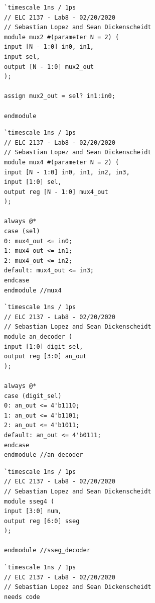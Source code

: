 \documentclass[11pt]{article}
\begin{document}
\begin{lstlisting}[style=Verilog,
caption=mux2 Code,
label=code:ex 
]
`timescale 1ns / 1ps
// ELC 2137 - Lab8 - 02/20/2020
// Sebastian Lopez and Sean Dickenscheidt
module mux2 #(parameter N = 2) (
input [N - 1:0] in0, in1,
input sel,
output [N - 1:0] mux2_out
); 

assign mux2_out = sel? in1:in0; 

endmodule  
\end{lstlisting}

\begin{lstlisting}[style=Verilog,
caption=mux4 Code,
label=code:ex 
]
`timescale 1ns / 1ps
// ELC 2137 - Lab8 - 02/20/2020
// Sebastian Lopez and Sean Dickenscheidt
module mux4 #(parameter N = 2) (
input [N - 1:0] in0, in1, in2, in3, 
input [1:0] sel, 
output reg [N - 1:0] mux4_out
);

always @*
case (sel) 
0: mux4_out <= in0; 
1: mux4_out <= in1; 
2: mux4_out <= in2; 
default: mux4_out <= in3;     
endcase 
endmodule //mux4 
\end{lstlisting}

\begin{lstlisting}[style=Verilog,
caption=an decoder Code,
label=code:ex 
]
`timescale 1ns / 1ps
// ELC 2137 - Lab8 - 02/20/2020
// Sebastian Lopez and Sean Dickenscheidt
module an_decoder (
input [1:0] digit_sel,
output reg [3:0] an_out
);

always @*
case (digit_sel) 
0: an_out <= 4'b1110; 
1: an_out <= 4'b1101; 
2: an_out <= 4'b1011; 
default: an_out <= 4'b0111;     
endcase 
endmodule //an_decoder 
\end{lstlisting}

\begin{lstlisting}[style=Verilog,
caption=sseg4 Code,
label=code:ex 
]
`timescale 1ns / 1ps
// ELC 2137 - Lab8 - 02/20/2020
// Sebastian Lopez and Sean Dickenscheidt
module sseg4 (
input [3:0] num,
output reg [6:0] sseg 
);

endmodule //sseg_decoder
\end{lstlisting}

\begin{lstlisting}[style=Verilog,
caption=sseg4 manual Code,
label=code:ex 
]
`timescale 1ns / 1ps
// ELC 2137 - Lab8 - 02/20/2020
// Sebastian Lopez and Sean Dickenscheidt
needs code 
\end{lstlisting}
\end{document}
